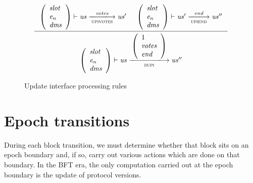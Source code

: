 \documentclass[11pt,a4paper]{article}
\newcommand{\var}[1]{\mathit{#1}}
\newcommand{\fun}[1]{\mathsf{#1}}
\newcommand{\type}[1]{\mathsf{#1}}
\newcommand{\trans}[2]{\xlongrightarrow[\textsc{#1}]{#2}}
\begin{document}
\begin{figure}[ht]
  \vspace{20pt}
  \begin{equation*}
    \inference
    { {\left(
          \begin{array}{l}
            \var{slot} \\
            \var{e_n} \\
            \var{dms}
          \end{array}
        \right)}
      \vdash \var{us} \trans{upivotes}{\var{votes}} \var{us'}
      &
      {\left(
          \begin{array}{l}
            \var{slot} \\
            \var{e_n} \\
            \var{dms}
          \end{array}
        \right)}
      \vdash \var{us'} \trans{upiend}{\var{end}} \var{us''}
    }
    {
      {\left(
          \begin{array}{l}
            \var{slot} \\
            \var{e_n} \\
            \var{dms}
          \end{array}
        \right)}
      \vdash \var{us}
      \trans{bupi}{
        \left(
          \begin{array}{l}
            1 \\
            \var{votes} \\
            \var{end}
          \end{array}
        \right)
      }
      \var{us''}
    }
  \end{equation*}
  \caption{Update interface processing rules}
  \label{fig:rules:bupi}
\end{figure}

\clearpage

\section{Epoch transitions}

\newcommand{\Epoch}{\type{Epoch}}

\newcommand{\ETState}{\type{ETState}}
\newcommand{\ETEnv}{\type{ETEnv}}

\newcommand{\sepochname}{sEpoch}
\newcommand{\sepoch}[2]{\fun{\sepochname}\ #1\ #2}

During each block transition, we must determine whether that block sits on an
epoch boundary and, if so, carry out various actions which are done on that
boundary. In the BFT era, the only computation carried out at the epoch boundary
is the update of protocol versions.
\end{document}
